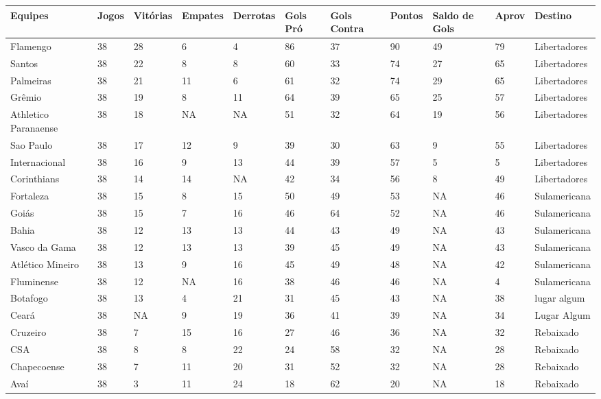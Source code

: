 \documentclass[
]{book}
\begin{document}
\begin{table}
\centering\begingroup\fontsize{11.5}{13.5}\selectfont

\begin{tabular}{l|l|l|l|l|l|l|l|l|l|l}
\hline
Equipes & Jogos & Vitórias & Empates & Derrotas & Gols Pró & Gols Contra & Pontos & Saldo de Gols & Aprov  & Destino\\
\hline
Flamengo & 38 & 28 & 6 & 4 & 86 & 37 & 90 & 49 & 79 & Libertadores\\
\hline
Santos & 38 & 22 & 8 & 8 & 60 & 33 & 74 & 27 & 65 & Libertadores\\
\hline
Palmeiras & 38 & 21 & 11 & 6 & 61 & 32 & 74 & 29 & 65 & Libertadores\\
\hline
Grêmio & 38 & 19 & 8 & 11 & 64 & 39 & 65 & 25 & 57 & Libertadores\\
\hline
Athletico Paranaense & 38 & 18 & NA & NA & 51 & 32 & 64 & 19 & 56 & Libertadores\\
\hline
Sao Paulo & 38 & 17 & 12 & 9 & 39 & 30 & 63 & 9 & 55 & Libertadores\\
\hline
Internacional & 38 & 16 & 9 & 13 & 44 & 39 & 57 & 5 & 5 & Libertadores\\
\hline
Corinthians & 38 & 14 & 14 & NA & 42 & 34 & 56 & 8 & 49 & Libertadores\\
\hline
Fortaleza & 38 & 15 & 8 & 15 & 50 & 49 & 53 & NA & 46 & Sulamericana\\
\hline
Goiás & 38 & 15 & 7 & 16 & 46 & 64 & 52 & NA & 46 & Sulamericana\\
\hline
Bahia & 38 & 12 & 13 & 13 & 44 & 43 & 49 & NA & 43 & Sulamericana\\
\hline
Vasco da Gama & 38 & 12 & 13 & 13 & 39 & 45 & 49 & NA & 43 & Sulamericana\\
\hline
Atlético Mineiro & 38 & 13 & 9 & 16 & 45 & 49 & 48 & NA & 42 & Sulamericana\\
\hline
Fluminense & 38 & 12 & NA & 16 & 38 & 46 & 46 & NA & 4 & Sulamericana\\
\hline
Botafogo & 38 & 13 & 4 & 21 & 31 & 45 & 43 & NA & 38 & lugar algum\\
\hline
Ceará & 38 & NA & 9 & 19 & 36 & 41 & 39 & NA & 34 & Lugar Algum\\
\hline
Cruzeiro & 38 & 7 & 15 & 16 & 27 & 46 & 36 & NA & 32 & Rebaixado\\
\hline
CSA & 38 & 8 & 8 & 22 & 24 & 58 & 32 & NA & 28 & Rebaixado\\
\hline
Chapecoense & 38 & 7 & 11 & 20 & 31 & 52 & 32 & NA & 28 & Rebaixado\\
\hline
Avaí & 38 & 3 & 11 & 24 & 18 & 62 & 20 & NA & 18 & Rebaixado\\
\hline
\end{tabular}
\endgroup{}
\end{table}
\end{document}
